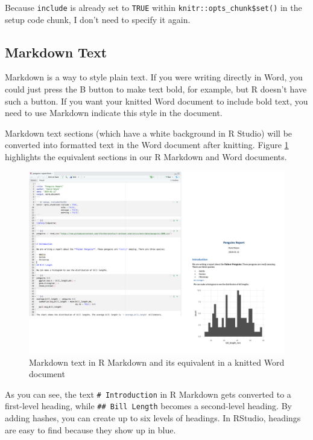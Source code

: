 \documentclass[
]{book}
\begin{document}
Because \texttt{include} is already set to \texttt{TRUE} within \texttt{knitr::opts\_chunk\$set()} in the setup code chunk, I don't need to specify it again.

\hypertarget{markdown-text}{%
\subsection*{Markdown Text}\label{markdown-text}}

Markdown is a way to style plain text. If you were writing directly in Word, you could just press the B button to make text bold, for example, but R doesn't have such a button. If you want your knitted Word document to include bold text, you need to use Markdown indicate this style in the document.

Markdown text sections (which have a white background in R Studio) will be converted into formatted text in the Word document after knitting. Figure \ref{fig:markdown-text-to-word} highlights the equivalent sections in our R Markdown and Word documents.

\begin{figure}
\includegraphics[width=1\linewidth]{assets/markdown-text-to-word} \caption{Markdown text in R Markdown and its equivalent in a knitted Word document}\label{fig:markdown-text-to-word}
\end{figure}

As you can see, the text \texttt{\#\ Introduction} in R Markdown gets converted to a first-level heading, while \texttt{\#\#\ Bill\ Length} becomes a second-level heading. By adding hashes, you can create up to six levels of headings. In RStudio, headings are easy to find because they show up in blue.
\end{document}
